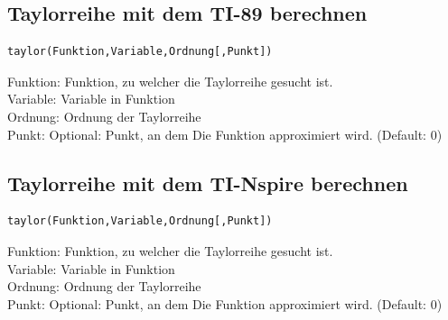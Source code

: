 \ifti
\subsection{Taylorreihe mit dem TI-89 berechnen}
\begin{verbatim}
taylor(Funktion,Variable,Ordnung[,Punkt])
\end{verbatim}
Funktion: Funktion, zu welcher die Taylorreihe gesucht ist. \\
Variable: Variable in Funktion\\
Ordnung: Ordnung der Taylorreihe\\
Punkt: Optional: Punkt, an dem Die Funktion approximiert wird. (Default: 0)
\fi
\ifnspire
\subsection{Taylorreihe mit dem TI-Nspire berechnen}
\begin{verbatim}
taylor(Funktion,Variable,Ordnung[,Punkt])
\end{verbatim}
Funktion: Funktion, zu welcher die Taylorreihe gesucht ist. \\
Variable: Variable in Funktion\\
Ordnung: Ordnung der Taylorreihe\\
Punkt: Optional: Punkt, an dem Die Funktion approximiert wird. (Default: 0)
\fi
